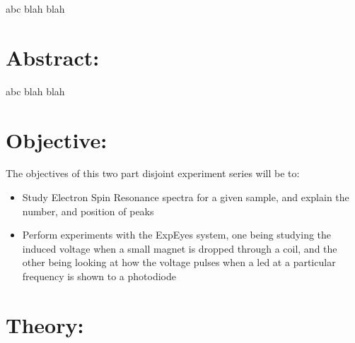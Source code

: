 \begin{Abstract:}
abc blah blah


\section{Abstract:}
abc blah blah

\section{Objective:}
The objectives of this two part disjoint experiment series will be to:
\begin{itemize}
	\item Study Electron Spin Resonance spectra for a given sample, and explain the number, and position of peaks
	\item Perform experiments with the ExpEyes system, one being studying the induced voltage when a small magnet is dropped through a coil, and the other being looking at how the voltage pulses when a led at a particular frequency is shown to a photodiode
\end{itemize}

\section{Theory:}

\end{Abstract:}
